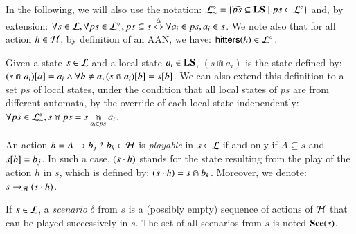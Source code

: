 In the following, we will also use the notation:
$\PHsublset[\PHl] = \{ \toset{ps} \subseteq \Proc \mid ps \in \PHsubl[\PHl] \}$
and, by extension:
$\forall s \in \PHl, \forall ps \in \PHsublset[\PHl],
  ps \subseteq s \EQDEF \forall a_i \in ps, a_i \in s$.
We note also that for all action $h \in \PHh$, by definition of an AAN, we have:
$\hitter{h} \in \PHsublset[\PHl]$.

\begin{definition}[$\Cap : \PHl \times \PHproc \rightarrow \PHl$]
\label{def:statecap}
  Given a state $s \in \PHl$ and a local state $a_i \in \PHproc$, $(s \Cap a_i)$ is the state defined by:
  $\PHget{(s \Cap a_i)}{a} = a_i \wedge \forall b \neq a, \PHget{(s \Cap a_i)}{b} = \PHget{s}{b}$.
  We can also extend this definition to a set $ps$ of local states,
  under the condition that all local states of $ps$ are from different automata,
  by the override of each local state independently:
  $\forall ps \in \PHsublset[\PHl], s \Cap ps = s \underset{a_i \in ps}{\Cap} a_i$.
\end{definition}

\begin{definition}
\label{def:play}
  An action $h = \PHhit{A}{b_j}{b_k} \in \PHa$ is \emph{playable} in $s \in \PHl$
  if and only if $A \subseteq s$ and $\PHget{s}{b} = b_j$.
  In such a case, $(s \PHplay h)$ stands for the state resulting from the play of the action $h$ in $s$, which is defined by: $(s \PHplay h) = s \Cap b_k$.
  Moreover, we denote: $s \PHPtrans (s \PHplay h)$.

  If $s \in \PHl$,
  a \emph{scenario} $\delta$ from $s$ is a (possibly empty) sequence of actions of $\PHh$
  that can be played successively in $s$.
  The set of all scenarios from $s$ is noted $\Sce(s)$.
\end{definition}



